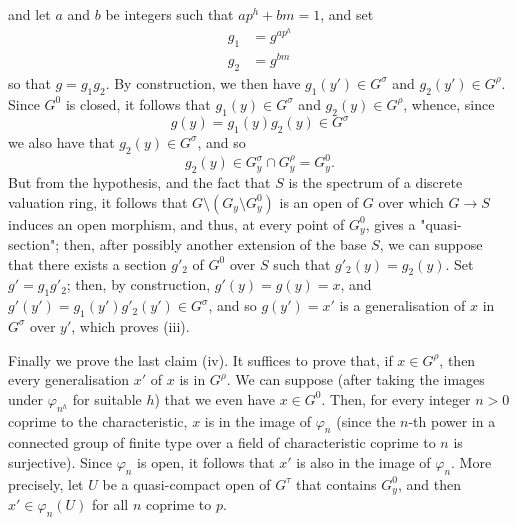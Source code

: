   and let \(a\) and \(b\) be integers such that \(ap^h+bm=1\), and set
  \[     \begin {aligned}       g_1       &= g^{ap^h}     \\g_2       &= g^{bm}     \end {aligned}   \]
  so that \(g=g_1g_2\).
  By construction, we then have \(g_1(y')\in  G^\sigma \) and \(g_2(y')\in  G^\rho \).
  Since \(G^0\) is closed, it follows that \(g_1(y)\in  G^\sigma \) and \(g_2(y)\in  G^\rho \), whence, since
  \[     g(y)     = g_1(y)g_2(y) \in  G^\sigma    \]
  we also have that \(g_2(y)\in  G^\sigma \), and so
  \[     g_2(y)\in  G_y^\sigma \cap  G_y^\rho      = G_y^0.   \]
  But from the hypothesis, and the fact that \(S\) is the spectrum of a discrete valuation ring, it follows that \(G\setminus (G_y\setminus  G_y^0)\) is an open of \(G\) over which \(G\to  S\) induces an open morphism, and thus, at every point of \(G_y^0\), gives a "quasi-section";
  then, after possibly another extension of the base \(S\), we can suppose that there exists a section \(g'_2\) of \(G^0\) over \(S\) such that \(g'_2(y)=g_2(y)\).
  Set \(g'=g_1g'_2\);
  then, by construction, \(g'(y)=g(y)=x\), and \(g'(y')=g_1(y')g'_2(y')\in  G^\sigma \), and so \(g(y')=x'\) is a generalisation of \(x\) in \(G^\sigma \) over \(y'\), which proves (iii).\par{}Finally we prove the last claim (iv).
  It suffices to prove that, if \(x\in  G^\rho \), then every generalisation \(x'\) of \(x\) is in \(G^\rho \).
  We can suppose (after taking the images under \(\varphi _{n^h}\) for suitable \(h\)) that we even have \(x\in  G^0\).
  Then, for every integer \(n>0\) coprime to the characteristic, \(x\) is in the image of \(\varphi _n\) (since the \(n\)-th power in a connected group of finite type over a field of characteristic coprime to \(n\) is surjective).
  Since \(\varphi _n\) is open, it follows that \(x'\) is also in the image of \(\varphi _n\).
  More precisely, let \(U\) be a quasi-compact open of \(G^\tau \) that contains \(G_y^0\), and then \(x'\in \varphi _n(U)\) for all \(n\) coprime to \(p\).
